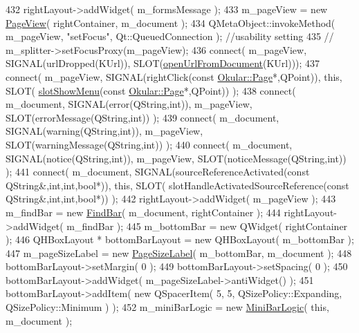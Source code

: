 \begin{DoxyCode}
{432     rightLayout->addWidget( m\_formsMessage );
433     m\_pageView = \textcolor{keyword}{new} \hyperlink{classPageView}{PageView}( rightContainer, m\_document );
434     QMetaObject::invokeMethod( m\_pageView, \textcolor{stringliteral}{"setFocus"}, Qt::QueuedConnection );      \textcolor{comment}{//usability setting}
435 \textcolor{comment}{//    m\_splitter->setFocusProxy(m\_pageView);}
436     connect( m\_pageView, SIGNAL(urlDropped(KUrl)), SLOT(\hyperlink{classOkular_1_1Part_a95dad8c98085c2a00d68864bb967140d}{openUrlFromDocument}(KUrl)));
437     connect( m\_pageView, SIGNAL(rightClick(\textcolor{keyword}{const} \hyperlink{classOkular_1_1Page}{Okular::Page}*,QPoint)), \textcolor{keyword}{this}, SLOT(
      \hyperlink{classOkular_1_1Part_a8b10f21181b6b35ba85586081ea4055f}{slotShowMenu}(\textcolor{keyword}{const} \hyperlink{classOkular_1_1Page}{Okular::Page}*,QPoint)) );
438     connect( m\_document, SIGNAL(error(QString,\textcolor{keywordtype}{int})), m\_pageView, SLOT(errorMessage(QString,\textcolor{keywordtype}{int})) );
439     connect( m\_document, SIGNAL(warning(QString,\textcolor{keywordtype}{int})), m\_pageView, SLOT(warningMessage(QString,\textcolor{keywordtype}{int})) );
440     connect( m\_document, SIGNAL(notice(QString,\textcolor{keywordtype}{int})), m\_pageView, SLOT(noticeMessage(QString,\textcolor{keywordtype}{int})) );
441     connect( m\_document, SIGNAL(sourceReferenceActivated(\textcolor{keyword}{const} QString&,\textcolor{keywordtype}{int},\textcolor{keywordtype}{int},\textcolor{keywordtype}{bool}*)), \textcolor{keyword}{this}, SLOT(
      slotHandleActivatedSourceReference(\textcolor{keyword}{const} QString&,\textcolor{keywordtype}{int},\textcolor{keywordtype}{int},\textcolor{keywordtype}{bool}*)) );
442     rightLayout->addWidget( m\_pageView );
443     m\_findBar = \textcolor{keyword}{new} \hyperlink{classFindBar}{FindBar}( m\_document, rightContainer );
444     rightLayout->addWidget( m\_findBar );
445     m\_bottomBar = \textcolor{keyword}{new} QWidget( rightContainer );
446     QHBoxLayout * bottomBarLayout = \textcolor{keyword}{new} QHBoxLayout( m\_bottomBar );
447     m\_pageSizeLabel = \textcolor{keyword}{new} \hyperlink{classPageSizeLabel}{PageSizeLabel}( m\_bottomBar, m\_document );
448     bottomBarLayout->setMargin( 0 );
449     bottomBarLayout->setSpacing( 0 );
450     bottomBarLayout->addWidget( m\_pageSizeLabel->antiWidget() );
451     bottomBarLayout->addItem( \textcolor{keyword}{new} QSpacerItem( 5, 5, QSizePolicy::Expanding, QSizePolicy::Minimum ) );
452     m\_miniBarLogic = \textcolor{keyword}{new} \hyperlink{classMiniBarLogic}{MiniBarLogic}( \textcolor{keyword}{this}, m\_document );
}
\end{DoxyCode}
